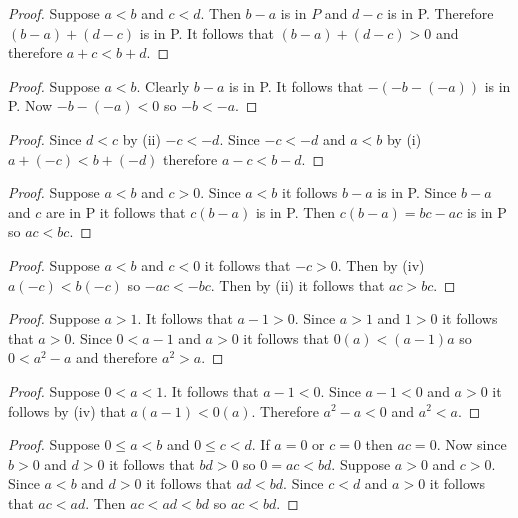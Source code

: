 \begin{proof}
    Suppose $a < b$ and $c < d$.
    Then $b - a$ is in $P$ and $d - c$ is in P.
    Therefore $(b - a) + (d - c)$ is in P.
    It follows that $(b - a) + (d - c) > 0$ and therefore $a + c < b + d$.
\end{proof}

\begin{proof}
    Suppose $a < b$.
    Clearly $b - a$ is in P.
    It follows that $-(-b - (-a))$ is in P.
    Now $-b - (-a) < 0$ so $-b < -a$.
\end{proof}

\begin{proof}
    Since $d < c$ by (ii) $-c < -d$.
    Since $-c < -d$ and $a < b$ by (i)
        $a + (-c) < b + (-d)$ therefore $a - c < b - d$.
\end{proof}

\begin{proof}
    Suppose $a < b$ and $c > 0$.
    Since $a < b$ it follows $b - a$ is in P.
    Since $b - a$ and $c$ are in P it follows that $c(b - a)$ is in P.
    Then $c(b - a) = bc - ac$ is in P so $ac < bc$.
\end{proof}

\begin{proof}
    Suppose $a < b$ and $c < 0$ it follows that $-c > 0$.
    Then by (iv) $a(-c) < b(-c)$ so $-ac < -bc$.
    Then by (ii) it follows that $ac > bc$.
\end{proof}

\begin{proof}
    Suppose $a > 1$. It follows that $a - 1 > 0$.
    Since $a > 1$ and $1 > 0$ it follows that $a > 0$.
    Since $0 < a - 1$ and $a > 0$ it follows that $0(a) < (a - 1)a$
        so $0 < a^2 - a$ and therefore $a^2 > a$.
\end{proof}

\begin{proof}
    Suppose $0 < a < 1$. It follows that $a - 1 < 0$.
    Since $a - 1 < 0$ and $a > 0$ it follows by (iv)
        that $a(a - 1) < 0(a)$.
    Therefore $a^2 - a < 0$ and $a^2 < a$.
\end{proof}

\begin{proof}
    Suppose $0 \le a < b$ and $0 \le c < d$.
    If $a = 0$ or $c = 0$ then $ac = 0$. Now since 
        $b > 0$ and $d > 0$ it follows that  $bd > 0$ so $0 = ac < bd$. 
    Suppose $a > 0$ and $c > 0$.
    Since $a < b$ and $d > 0$ it follows that $ad < bd$.
    Since $c < d$ and $a > 0$ it follows that $ac < ad$.
    Then $ac < ad < bd$ so $ac < bd$.
\end{proof}

